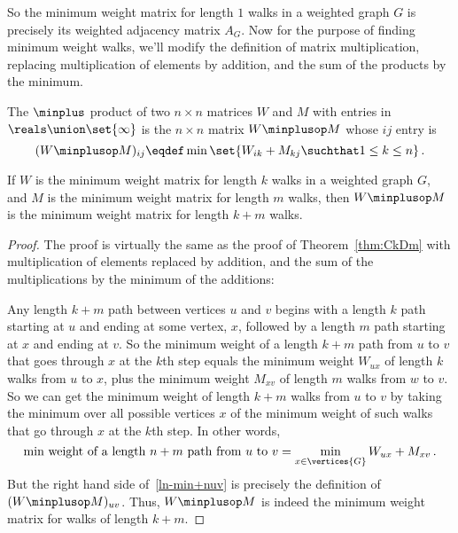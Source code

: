 So the minimum weight matrix for length $1$ walks in a weighted graph
$G$ is precisely its weighted adjacency matrix $A_G$.  Now for the
purpose of finding minimum weight walks, we'll modify the definition
of matrix multiplication, replacing multiplication of elements by
addition, and the sum of the products by the minimum.

\begin{definition}\label{def:minplus}
  The $\minplus$ product of two $n\times n$ matrices $W$ and $M$ with
  entries in $\reals\union \set{\infty}$ is the $n \times n$ matrix
  $W\minplusop M$ whose $ij$ entry is
\[
(W\minplusop M )_{ij} \eqdef \min \set{W_{ik} + M_{kj} \suchthat 1 \leq k \leq n}\, .
\]
\end{definition}

\begin{theorem}\label{thm:weightmatrix-min+}
  If $W$ is the minimum weight matrix for length $k$ walks in a
  weighted graph $G$, and $M$ is the minimum weight matrix for length
  $m$ walks, then $W\minplusop M$ is the minimum weight matrix for
  length $k+m$ walks.
\end{theorem}

\begin{proof}
  The proof is virtually the same as the proof of Theorem~\ref{thm:CkDm}
  with multiplication of elements replaced by addition, and the sum of the
  multiplications by the minimum of the additions:

  Any length $k+m$ path between vertices $u$ and $v$ begins with a length
  $k$ path starting at $u$ and ending at some vertex, $x$, followed by a
  length $m$ path starting at $x$ and ending at $v$.  So the minimum
  weight of a length $k+m$ path from $u$ to $v$ that goes through $x$ at
  the $k$th step equals the minimum weight $W_{ux}$ of length $k$ walks
  from $u$ to $x$, plus the minimum weight $M_{xv}$ of length $m$ walks
  from $w$ to $v$.  So we can get the minimum weight of length $k+m$ walks
  from $u$ to $v$ by taking the minimum over all possible vertices $x$ of
  the minimum weight of such walks that go through $x$ at the $k$th step.
  In other words,
\begin{equation}\label{ln-min+nuv}
\text{min weight of a length $n+m$ path from $u$ to $v$} =
              \min_{x \in \vertices{G}} W_{ux}+M_{xv}\, .
\end{equation}
But the right hand side of~\eqref{ln-min+nuv} is precisely the definition of
$(W\minplusop M)_{uv}$.  Thus, $W\minplusop M$ is indeed the minimum weight
matrix for walks of length $k+m$.
\end{proof}


